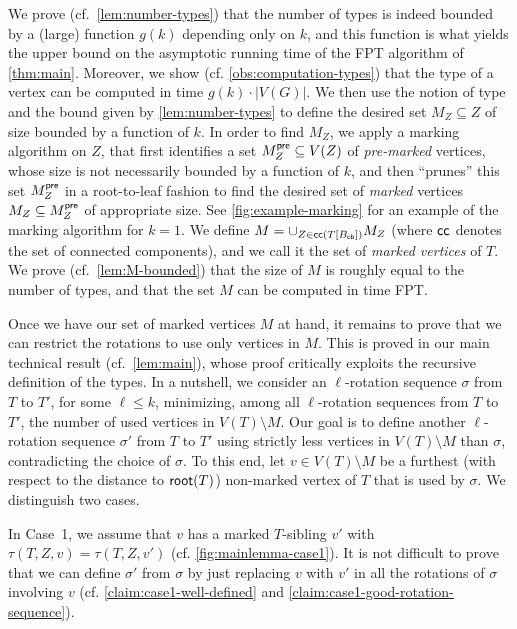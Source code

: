 \documentclass[a4paper,UKenglish,cleveref, autoref, thm-restate]{lipics-v2021}
\renewcommand{\root}{{\sf root}\xspace}
\newcommand{\Bcb}{B_{\sf cb}\xspace}
\newcommand{\FPT}{{\sf FPT}\xspace}
\begin{document}
We prove (cf.~\autoref{lem:number-types}) that the number of types is indeed bounded by a (large) function $g(k)$ depending only on $k$, and this function is what yields the upper bound on the asymptotic running time of the \FPT algorithm of \autoref{thm:main}. Moreover, we show (cf. \autoref{obs:computation-types}) that the type of a vertex can be computed in time $g(k) \cdot |V(G)|$. We then use the notion of type and the bound given by \autoref{lem:number-types} to define the desired set
$M_Z \subseteq Z$ of size bounded by a function of $k$.
In order to find $M_Z$, we apply a marking algorithm on $Z$, that first identifies a set $M_Z^{\sf pre} \subseteq V(Z)$ of \textit{pre-marked} vertices, whose size is not necessarily bounded by a function of $k$, and then ``prunes'' this set $M_Z^{\sf pre}$ in a root-to-leaf fashion to find the desired  set of \textit{marked} vertices $M_Z \subseteq M_Z^{\sf pre}$ of appropriate size. See \autoref{fig:example-marking} for an example of the marking algorithm for $k=1$. We define $M = \cup_{Z \in {\sf cc}(T[\Bcb])}M_Z$ (where ${\sf cc}$ denotes the set of connected components), and we call it the set of \emph{marked vertices} of $T$. We prove (cf.~\autoref{lem:M-bounded}) that the size of $M$ is roughly equal to the number of types, and that the set $M$ can be computed in time \FPT.

Once we have our set of marked vertices $M$ at hand, it remains to prove that we can restrict the rotations to use only vertices in $M$. This is proved in our main technical result (cf.~\autoref{lem:main}), whose proof critically exploits the recursive definition of the types. In a nutshell, we consider an $\ell$-rotation sequence $\sigma$ from $T$ to $T'$, for some $\ell \leq k$, minimizing, among all $\ell$-rotation sequences from $T$ to $T'$, the number of used vertices in $V(T) \setminus M$. Our goal is to define another $\ell$-rotation sequence $\sigma'$ from $T$ to $T'$ using strictly less vertices in $V(T) \setminus M$ than $\sigma$, contradicting the choice of $\sigma$.  To this end, let $v \in V(T) \setminus M$ be a furthest (with respect to the distance to $\root(T)$) non-marked vertex of $T$ that is used by $\sigma$. We distinguish two cases.

In Case~1, we assume that $v$ has a marked $T$-sibling $v'$ with $\tau(T,Z,v)=\tau(T,Z,v')$ (cf. \autoref{fig:mainlemma-case1}). It is not difficult to prove that we can define $\sigma'$ from $\sigma$ by just replacing $v$ with $v'$ in all the rotations of $\sigma$ involving $v$ (cf. \autoref{claim:case1-well-defined} and
\autoref{claim:case1-good-rotation-sequence}).
\end{document}
